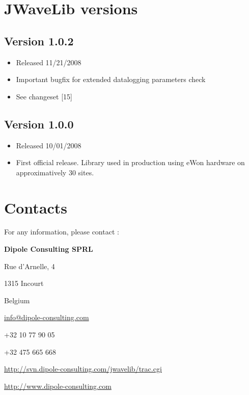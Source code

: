 \documentclass[a4paper,10pt,english]{sphinxmanual}
\begin{document}
\chapter{JWaveLib versions}
\label{version:jwavelib-versions}\label{version::doc}

\section{Version 1.0.2}
\label{version:version-1-0-2}\begin{itemize}
\item {} 
Released 11/21/2008

\item {} 
Important bugfix for extended datalogging parameters check

\item {} 
See changeset {[}15{]}

\end{itemize}


\section{Version 1.0.0}
\label{version:version-1-0-0}\begin{itemize}
\item {} 
Released 10/01/2008

\item {} 
First official release. Library used in production using eWon hardware on approximatively 30 sites.

\end{itemize}


\chapter{Contacts}
\label{contacts::doc}\label{contacts:contacts}
For any information, please contact :

\begin{DUlineblock}{0em}
\item[] \textbf{Dipole Consulting SPRL}
\item[] Rue d'Arnelle, 4
\item[] 1315 Incourt
\item[] Belgium
\item[] 
\item[] \href{mailto:info@dipole-consulting.com}{info@dipole-consulting.com}
\item[] +32 10 77 90 05
\item[] +32 475 665 668
\item[] 
\item[] \href{http://svn.dipole-consulting.com/jwavelib/trac.cgi}{http://svn.dipole-consulting.com/jwavelib/trac.cgi}
\item[] \href{http://www.dipole-consulting.com}{http://www.dipole-consulting.com}
\end{DUlineblock}



\renewcommand{\indexname}{Index}
\printindex
\end{document}
